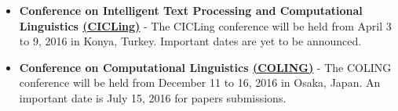 \begin{itemize}
    \item \textbf{Conference on Intelligent Text Processing and Computational Linguistics \href{http://www.cicling.org/2016}{(CICLing)}} - The CICLing conference will be held from April 3 to 9, 2016 in Konya, Turkey. Important dates are yet to be announced.
    
    \item \textbf{Conference on Computational Linguistics \href{http://coling2016.anlp.jp}{(COLING)}} - The COLING conference will be held from December 11 to 16, 2016 in Osaka, Japan. An important date is July 15, 2016 for papers submissions.
    
\end{itemize}
%


